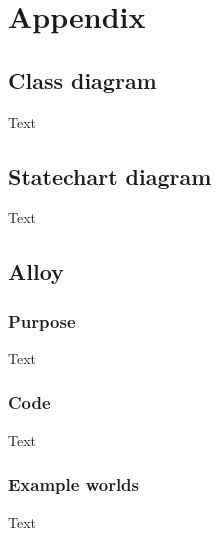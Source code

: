 \section{Appendix}
\subsection{Class diagram}
Text
\subsection{Statechart diagram}
Text
\subsection{Alloy}
\subsubsection{Purpose}
Text
\subsubsection{Code}
Text
\subsubsection{Example worlds}
Text